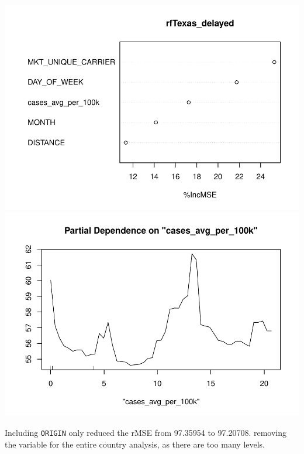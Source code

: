 \documentclass[
]{article}
\begin{document}
\includegraphics{final-project_files/figure-latex/rf-delaytime-3.pdf}
\includegraphics{final-project_files/figure-latex/rf-delaytime-4.pdf}

Including \texttt{ORIGIN} only reduced the rMSE from 97.35954 to
97.20708. removing the variable for the entire country analysis, as
there are too many levels.
\end{document}
